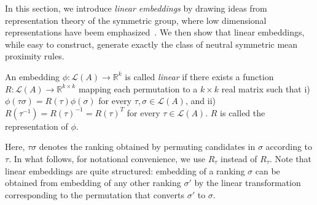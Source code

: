 \documentclass[10pt,letterpaper]{article}
\newcommand{\calL}{{\mathcal{L}}}
\newcommand{\rank}{{\calL(A)}}
\newenvironment{definition}[1][Definition]{\begin{trivlist}
\item[\hskip \labelsep {\bfseries #1}]}{\end{trivlist}}
\begin{document}
In this section, we introduce \emph{linear embeddings} by drawing ideas from representation theory of the symmetric group, where low dimensional representations have beem emphasized~\cite{Burnside12,KT12}. We then show that linear embeddings, while easy to construct, generate exactly the class of neutral symmetric mean proximity rules. 


\begin{definition}[Linear Embeddings]
An embedding $\phi:\rank \rightarrow \mathbb{R}^k$ is called \emph{linear} if there exists a function $R : \rank \rightarrow \mathbb{R}^{k \times k}$ mapping each permutation to a $k \times k$ real matrix such that i) $\phi(\tau \sigma) = R(\tau) \phi(\sigma)$ for every $\tau,\sigma \in \rank$, and ii) $R(\tau^{-1}) = R(\tau)^{-1} = R(\tau)^T$ for every $\tau \in \rank$. $R$ is called the representation of $\phi$. 
\end{definition}
Here, $\tau \sigma$ denotes the ranking obtained by permuting candidates in $\sigma$ according to $\tau$. In what follows, for notational convenience, we use $R_{\tau}$ instead of $R_{\tau}$. Note that linear embeddings are quite structured: embedding of a ranking $\sigma$ can be obtained from embedding of any other ranking $\sigma'$ by the linear transformation corresponding to the permutation that converts $\sigma'$ to $\sigma$. 
\end{document}
